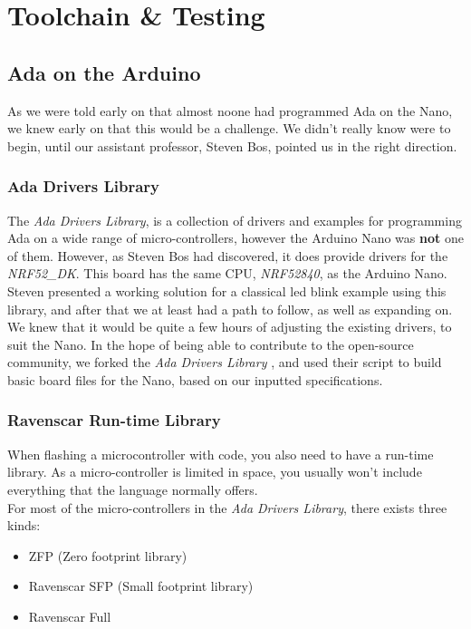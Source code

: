\documentclass{article}
\begin{document}
\section{Toolchain \& Testing}
\subsection{Ada on the Arduino}
As we were told early on that almost noone had programmed Ada on the Nano, we knew early on that this would be a challenge. We didn't really know were to begin, until our assistant professor, Steven Bos, pointed us in the right direction. 

\subsubsection{Ada Drivers Library}

The \textit{Ada Drivers Library}, is a collection of drivers and examples for programming Ada on a wide range of micro-controllers, however the Arduino Nano was \textbf{not} one of them. However, as Steven Bos had discovered, it does provide drivers for the \textit{NRF52\_DK}. This board has the same CPU, \textit{NRF52840}, as the Arduino Nano. Steven presented a working solution for a classical led blink example using this library, and after that we at least had a path to follow, as well as expanding on.\\ 

We knew that it would be quite a few hours of adjusting the existing drivers, to suit the Nano. In the hope of being able to contribute to the open-source community, we forked the \textit{Ada Drivers Library}
, and used their script to build basic board files for the Nano, based on our inputted specifications. 


\subsubsection{Ravenscar Run-time Library}

When flashing a microcontroller with code, you also need to have a run-time library. As a micro-controller is limited in space, you usually won't include everything that the language normally offers.\\ 

For most of the micro-controllers in the \textit{Ada Drivers Library}, there exists three kinds:
\begin{itemize}
  \item{ZFP (Zero footprint library)}
  \item{Ravenscar SFP (Small footprint library)}
  \item{Ravenscar Full}
\end{itemize}
\end{document}
